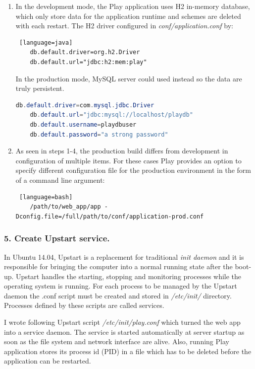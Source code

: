 \documentclass[12pt,twoside,a4paper]{report}
\begin{document}
\begin{enumerate}
\begin{lstlisting} [language=bash]
	playGenerateSecret
\end{lstlisting}
and stored in \emph{conf/application.conf} by:
\begin{lstlisting} [language=java]
	play.crypto.secret="</N_v`W4xv8GY^c7e=UCDYF]vXSguUvABIHoi[JNm1j@lf2C6S9TL[?FNM?ImDd;"
\end{lstlisting}
\item In the development mode, the Play application uses H2 in-memory database, which only store data for the application runtime and schemes are deleted with each restart. The H2 driver configured in \emph{conf/application.conf} by:
\begin{lstlisting} [language=java]
	db.default.driver=org.h2.Driver
	db.default.url="jdbc:h2:mem:play"
\end{lstlisting}
In the production mode, MySQL server could used instead so the data are truly persistent.
\begin{lstlisting}[language=java]
	db.default.driver=com.mysql.jdbc.Driver
	db.default.url="jdbc:mysql://localhost/playdb"
	db.default.username=playdbuser
	db.default.password="a strong password"
\end{lstlisting}
\item As seen in steps 1-4, the production build differs from development in configuration of multiple items. For these cases Play provides an option to specify different configuration file for the production environment in the form of a command line argument:
\begin{lstlisting} [language=bash]
	/path/to/web_app/app -Dconfig.file=/full/path/to/conf/application-prod.conf
\end{lstlisting}
\end{enumerate}

\subsubsection{5. Create Upstart service.}
In Ubuntu 14.04, Upstart is a replacement for traditional \emph{init daemon} and it is responsible for bringing the computer into a normal running state after the boot-up. Upstart handles the starting, stopping and monitoring processes while the operating system is running. For each process to be managed by the Upstart daemon the .conf script must be created and stored in \emph{/etc/init/} directory. Processes defined by these scripts are called services.

I wrote following Upstart script \emph{/etc/init/play.conf} which turned the web app into a service daemon. The service is  started automatically at server startup as soon as the file system and network interface are alive. Also, running Play application stores its process id (PID) in a file which has to be deleted before the application can be restarted.
\end{document}

